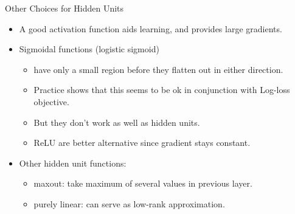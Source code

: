 
\begin{vbframe}{Other Choices for Hidden Units}

\vfill

\begin{itemize}
\item A good activation function aids learning, and provides large gradients.
\item Sigmoidal functions (logistic sigmoid)
\begin{itemize}
 \item have only a small region before they flatten out in either direction.
 \item Practice shows that this seems to be ok in conjunction with Log-loss objective.
 \item But they don't work as well as hidden units.
 \item ReLU are better alternative since gradient stays constant.
\end{itemize}
\item Other hidden unit functions:
\begin{itemize}
 \item maxout: take maximum of several values in previous layer.
 \item purely linear: can serve as low-rank approximation.
\end{itemize}
\end{itemize}
\begin{center}
\end{center}

\vfill

\end{vbframe}


\endlecture

